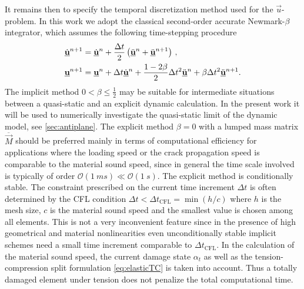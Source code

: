 It remains then to specify the temporal discretization method used for the $\vec{u}$-problem. In this work we adopt the classical second-order accurate Newmark-$\beta$ integrator, which assumes the following time-stepping procedure
\begin{align}
\dot{\uvec}^{n+1} &= \dot{\uvec}^n+\frac{\Delta t}{2}\left(\ddot{\uvec}^n+\ddot{\uvec}^{n+1}\right)\,, \label{eq:un2} \\
\uvec^{n+1} &= \uvec^n+\Delta t\dot{\uvec}^n+\frac{1-2\beta}{2}\Delta t^2\ddot{\uvec}^n+\beta\Delta t^2\ddot{\uvec}^{n+1}. \label{eq:un1}
\end{align}
The implicit method $0<\beta\leq\frac{1}{2}$ may be suitable for intermediate situations between a quasi-static and an explicit dynamic calculation. In the present work it will be used to numerically investigate the quasi-static limit of the dynamic model, see \cref{sec:antiplane}. The explicit method $\beta=0$ with a lumped mass matrix $\overline{\vec{M}}$ should be preferred mainly in terms of computational efficiency for applications where the loading speed or the crack propagation speed is comparable to the material sound speed, since in general the time scale involved is typically of order $\mathcal{O}(\SI{1}{ms})\ll\mathcal{O}(\SI{1}{s})$. The explicit method is conditionally stable. The constraint prescribed on the current time increment $\Delta t$ is often determined by the CFL condition $\Delta t<\Delta t_\mathrm{CFL}=\min(h/c)$ where $h$ is the mesh size, $c$ is the material sound speed and the smallest value is chosen among all elements. This is not a very inconvenient feature since in the presence of high geometrical and material nonlinearities even unconditionally stable implicit schemes need a small time increment comparable to $\Delta t_\mathrm{CFL}$. In the calculation of the material sound speed, the current damage state $\alpha_t$ as well as the tension-compression split formulation \eqref{eq:elasticTC} is taken into account. Thus a totally damaged element under tension does not penalize the total computational time.

